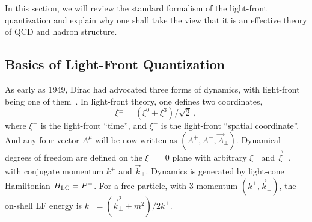 \documentclass[twocolumn,superscriptaddress,longbibliography,10pt]{revtex4-1}
\begin{document}
In this section, we will review the standard formalism
of the light-front quantization and explain why one shall take the
view that it is an effective theory of QCD and hadron structure.

\subsection{Basics of Light-Front Quantization}

As early as 1949, Dirac had advocated three forms of dynamics,
with light-front being one of them~\cite{Dirac:1949cp}.
In light-front theory, one defines two coordinates,
\begin{equation}
      \xi^\pm = (\xi^0\pm \xi^3)/\sqrt{2} \ ,
\end{equation}
where $\xi^+$ is the light-front ``time'', and $\xi^-$ is the
light-front ``spatial coordinate''. And any four-vector $A^\mu$ will be now written
as $(A^+,A^-,\vec{A}_\perp)$.
Dynamical degrees of freedom are defined on the $\xi^+=0$ plane with
arbitrary $\xi^-$ and $\vec{\xi}_\perp$, with conjugate momentum $k^+$
and $\vec{k}_\perp$. Dynamics is generated
by light-cone Hamiltonian $H_{\rm LC}=P^-$. For a free particle,
with 3-momentum $(k^+, \vec{k}_\perp)$, the on-shell LF
energy is $k^-=(\vec{k}_\perp^2+m^2)/2k^+$.
\end{document}
